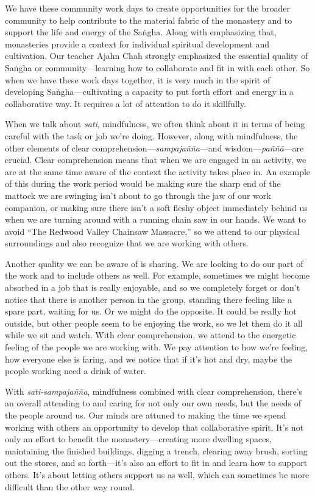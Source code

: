
We have these community work days to create opportunities for the 
broader community to help contribute to the material fabric of the 
monastery and to support the life and energy of the Saṅgha. Along 
with emphasizing that, monasteries provide a context for individual 
spiritual development and cultivation. Our teacher Ajahn Chah strongly 
emphasized the essential quality of Saṅgha or community---learning 
how to collaborate and fit in with each other. So when we have these 
work days together, it is very much in the spirit of developing 
Saṅgha---cultivating a capacity to put forth effort and energy in a 
collaborative way. It requires a lot of attention to do it skillfully.

When we talk about \emph{sati}, mindfulness, we often think about it in 
terms of being careful with the task or job we're doing. However, along 
with mindfulness, the other elements of clear 
comprehension---\emph{sampajañña}---and 
wisdom---\emph{paññā}---are crucial. Clear comprehension means that 
when we are engaged in an activity, we are at the same time aware of 
the context the activity takes place in. An example of this during the 
work period would be making sure the sharp end of the mattock we are 
swinging isn't about to go through the jaw of our work companion, or 
making sure there isn't a soft fleshy object immediately behind us when 
we are turning around with a running chain saw in our hands. We want to 
avoid ``The Redwood Valley Chainsaw Massacre,'' so we attend to our 
physical surroundings and also recognize that we are working with 
others.

Another quality we can be aware of is sharing. We are looking to do our 
part of the work and to include others as well. For example, sometimes 
we might become absorbed in a job that is really enjoyable, and so we 
completely forget or don't notice that there is another person in the 
group, standing there feeling like a spare part, waiting for us. Or we 
might do the opposite. It could be really hot outside, but other people 
seem to be enjoying the work, so we let them do it all while we sit and 
watch. With clear comprehension, we attend to the energetic feeling of 
the people we are working with. We pay attention to how we're feeling, 
how everyone else is faring, and we notice that if it's hot and dry, 
maybe the people working need a drink of water.

With \emph{sati-sampajañña}, mindfulness combined with clear 
comprehension, there's an overall attending to and caring for not only 
our own needs, but the needs of the people around us. Our minds are 
attuned to making the time we spend working with others an opportunity 
to develop that collaborative spirit. It's not only an effort to 
benefit the monastery---creating more dwelling spaces, maintaining the 
finished buildings, digging a trench, clearing away brush, sorting out 
the stores, and so forth---it's also an effort to fit in and learn how 
to support others. It's about letting others support us as well, which 
can sometimes be more difficult than the other way round.

